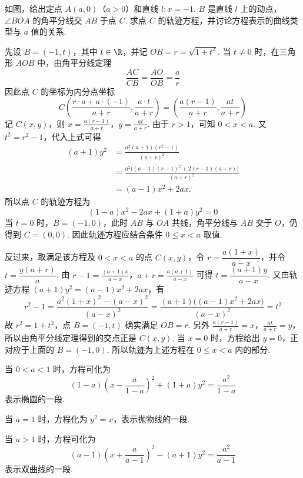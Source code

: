 \documentclass[UTF8,a4paper,oneside,11pt]{ctexbook}
\begin{document}
\begin{problem}
如图，给出定点 \(A(a,0)\)（\(a>0\)）和直线 \(l\colon x=-1\). \(B\) 是直线 \(l\) 上的动点，\(\angle BOA\) 的角平分线交 \(AB\) 于点 \(C\). 求点 \(C\) 的轨迹方程，并讨论方程表示的曲线类型与 \(a\) 值的关系.

\end{problem}

\begin{solution}
先设 \(B=(-1,t)\)，其中 \(t\in\R\)，并记 \(OB=r=\sqrt{1+t^2}\). 当 \(t\neq0\) 时，在三角形 \(AOB\) 中，由角平分线定理
\[
\frac{AC}{CB}=\frac{AO}{OB}=\frac ar
\]
因此点 \(C\) 的坐标为内分点坐标
\[
C\left(\frac{r\cdot a+a\cdot(-1)}{a+r},\frac{a\cdot t}{a+r}\right)
=\left(\frac{a(r-1)}{a+r},\frac{at}{a+r}\right)
\]
记 \(C(x,y)\)，则
\(x=\frac{a(r-1)}{a+r}\)，\(y=\frac{at}{a+r}\).
由于 \(r>1\)，可知 \(0<x<a\). 又 \(t^2=r^2-1\)，代入上式可得
\[
\begin{aligned}
(a+1)y^2
&=\frac{a^2(a+1)(r^2-1)}{(a+r)^2}\\
&=\frac{a^2\bigl((a-1)(r-1)^2+2(r-1)(a+r)\bigr)}{(a+r)^2}\\
&=(a-1)x^2+2ax.
\end{aligned}
\]
所以点 \(C\) 的轨迹方程为
\[
(1-a)x^2-2ax+(1+a)y^2=0
\]
当 \(t=0\) 时，\(B=(-1,0)\)，此时 \(AB\) 与 \(OA\) 共线，角平分线与 \(AB\) 交于 \(O\)，仍得到 \(C=(0,0)\). 因此轨迹方程应结合条件 \(0\leqslant x<a\) 取值.

反过来，取满足该方程及 \(0<x<a\) 的点 \(C(x,y)\)，令 \(r=\dfrac{a(1+x)}{a-x}\)，并令 \(t=\dfrac{y(a+r)}a\). 由
\(r-1=\frac{(a+1)x}{a-x}\)，\(a+r=\frac{a(a+1)}{a-x}\)
可得 \(t=\dfrac{(a+1)y}{a-x}\). 又由轨迹方程 \((a+1)y^2=(a-1)x^2+2ax\)，有
\[
r^2-1=\frac{a^2(1+x)^2-(a-x)^2}{(a-x)^2}=\frac{(a+1)\bigl((a-1)x^2+2ax\bigr)}{(a-x)^2}=t^2
\]
故 \(r^2=1+t^2\)，点 \(B=(-1,t)\) 确实满足 \(OB=r\). 另外
\(\frac{a(r-1)}{a+r}=x\)，\(\frac{at}{a+r}=y\)，
所以由角平分线定理得到的交点正是 \(C(x,y)\). 当 \(x=0\) 时，方程给出 \(y=0\)，正对应于上面的 \(B=(-1,0)\). 所以轨迹为上述方程在 \(0\leqslant x<a\) 内的部分.

当 \(0<a<1\) 时，方程可化为
\[
(1-a)\left(x-\frac{a}{1-a}\right)^2+(1+a)y^2=\frac{a^2}{1-a}
\]
表示椭圆的一段.

当 \(a=1\) 时，方程化为 \(y^2=x\)，表示抛物线的一段.

当 \(a>1\) 时，方程可化为
\[
(a-1)\left(x+\frac{a}{a-1}\right)^2-(a+1)y^2=\frac{a^2}{a-1}
\]
表示双曲线的一段.
\end{solution}

\end{document}
